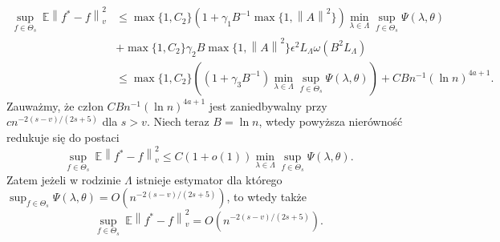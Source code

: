 \documentclass[man,mfiu]{mgrwms}
\newcommand{\norm}[1]{\left\lVert#1\right\rVert}
\begin{document}
\begin{displaymath}
\begin{split}
\sup_{f\in\Theta_s}\ \mathbb{E}\norm{f^*-f}_v^2&\leq \max \{1,C_2\}(1+\gamma_1B^{-1}\max\{1,\norm{A}^2\})\min_{\lambda\in \Lambda}\sup_{f\in\Theta_s}\Psi(\lambda,\theta)\\
& +\max \{1,C_2\}\gamma_2B\max \{1,\norm{A}^2\}\epsilon^2L_{\Lambda}\omega(B^2L_{\Lambda})\\
&\leq \max \{1,C_2\}\left((1+\gamma_3B^{-1})\min_{\lambda\in \Lambda}\sup_{f\in\Theta_s}\Psi(\lambda,\theta)\right)+CBn^{-1}\left(\ln n\right)^{4a+1}.
\end{split}
\end{displaymath}
Zauważmy, że człon $CBn^{-1}\left(\ln n\right)^{4a+1}$ jest zaniedbywalny przy $cn^{-2(s-v)/(2s+5)}$ dla $s>v$.
Niech teraz $B=\ln n$, wtedy powyższa nierówność redukuje się do postaci
\begin{displaymath}
\sup_{f\in\Theta_s}\ \mathbb{E}\norm{f^*-f}_v^2\leq C(1+o(1))\min_{\lambda\in \Lambda}\sup_{f\in\Theta_s}\Psi(\lambda,\theta).
\end{displaymath}
Zatem jeżeli w rodzinie $\Lambda$ istnieje estymator dla którego $\sup_{f\in\Theta_s}\Psi(\lambda,\theta)=O(n^{-2(s-v)/(2s+5)})$, to wtedy także 
\begin{displaymath}
\sup_{f\in\Theta_s}\ \mathbb{E}\norm{f^*-f}_v^2=O(n^{-2(s-v)/(2s+5)}).
\end{displaymath}
\end{document}
